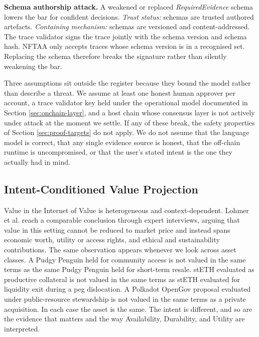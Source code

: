 \begin{description}[leftmargin=1.2cm,labelwidth=0.9cm,style=nextline,itemsep=0.85\baselineskip]
\item[\textbf{T10}] \textbf{Schema authorship attack.} A weakened or replaced \textit{RequiredEvidence} schema lowers the bar for confident decisions.
\textit{Trust status:} schemas are trusted authored artefacts.
\textit{Containing mechanism:} schemas are versioned and content-addressed. The trace validator signs the trace jointly with the schema version and schema hash. NFTAA only accepts traces whose schema version is in a recognised set. Replacing the schema therefore breaks the signature rather than silently weakening the bar.
\end{description}

Three assumptions sit outside the register because they bound the model rather than describe a threat. We assume at least one honest human approver per account, a trace validator key held under the operational model documented in Section \ref{sec:onchain-layer}, and a host chain whose consensus layer is not actively under attack at the moment we settle. If any of these break, the safety properties of Section \ref{sec:proof-targets} do not apply. We do not assume that the language model is correct, that any single evidence source is honest, that the off-chain runtime is uncompromised, or that the user's stated intent is the one they actually had in mind.

\subsection{Intent-Conditioned Value Projection}
\label{sec:icvp}

Value in the Internet of Value is heterogeneous and context-dependent. Lohmer et al. \cite{Lohmer2024} reach a comparable conclusion through expert interviews, arguing that value in this setting cannot be reduced to market price and instead spans economic worth, utility or access rights, and ethical and sustainability contributions. The same observation appears whenever we look across asset classes. A Pudgy Penguin held for community access is not valued in the same terms as the same Pudgy Penguin held for short-term resale. stETH evaluated as productive collateral is not valued in the same terms as stETH evaluated for liquidity exit during a peg dislocation. A Polkadot OpenGov proposal evaluated under public-resource stewardship is not valued in the same terms as a private acquisition. In each case the asset is the same. The intent is different, and so are the evidence that matters and the way Availability, Durability, and Utility are interpreted.

